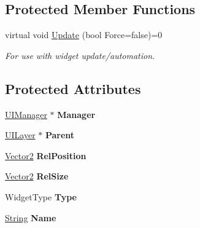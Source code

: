 \subsection*{Protected Member Functions}
\begin{DoxyCompactItemize}
\item 
\hypertarget{classphys_1_1UI_1_1Widget_a1806425fcd684c2f0d50cd0ef4a6b0da}{
virtual void \hyperlink{classphys_1_1UI_1_1Widget_a1806425fcd684c2f0d50cd0ef4a6b0da}{Update} (bool Force=false)=0}
\label{d9/d48/classphys_1_1UI_1_1Widget_a1806425fcd684c2f0d50cd0ef4a6b0da}

\begin{DoxyCompactList}\small\item\em For use with widget update/automation. \item\end{DoxyCompactList}\end{DoxyCompactItemize}
\subsection*{Protected Attributes}
\begin{DoxyCompactItemize}
\item 
\hypertarget{classphys_1_1UI_1_1Widget_a812fbbc32757b89af66053ea9b0f956c}{
\hyperlink{classphys_1_1UIManager}{UIManager} $\ast$ {\bfseries Manager}}
\label{d9/d48/classphys_1_1UI_1_1Widget_a812fbbc32757b89af66053ea9b0f956c}

\item 
\hypertarget{classphys_1_1UI_1_1Widget_a33b95e3f01d393093c5d5d9a0e496cf3}{
\hyperlink{classphys_1_1UILayer}{UILayer} $\ast$ {\bfseries Parent}}
\label{d9/d48/classphys_1_1UI_1_1Widget_a33b95e3f01d393093c5d5d9a0e496cf3}

\item 
\hypertarget{classphys_1_1UI_1_1Widget_a9b7d9a6919cf49639585634090c09ec7}{
\hyperlink{classphys_1_1Vector2}{Vector2} {\bfseries RelPosition}}
\label{d9/d48/classphys_1_1UI_1_1Widget_a9b7d9a6919cf49639585634090c09ec7}

\item 
\hypertarget{classphys_1_1UI_1_1Widget_a0b239b76dc82d6bf5c5c3fa268f83f3e}{
\hyperlink{classphys_1_1Vector2}{Vector2} {\bfseries RelSize}}
\label{d9/d48/classphys_1_1UI_1_1Widget_a0b239b76dc82d6bf5c5c3fa268f83f3e}

\item 
\hypertarget{classphys_1_1UI_1_1Widget_af957da7e0342010f3dad1c7b4a73f334}{
WidgetType {\bfseries Type}}
\label{d9/d48/classphys_1_1UI_1_1Widget_af957da7e0342010f3dad1c7b4a73f334}

\item 
\hypertarget{classphys_1_1UI_1_1Widget_a863f635b86ec75076e4c3978dc427679}{
\hyperlink{namespacephys_aa03900411993de7fbfec4789bc1d392e}{String} {\bfseries Name}}
\label{d9/d48/classphys_1_1UI_1_1Widget_a863f635b86ec75076e4c3978dc427679}

\end{DoxyCompactItemize}
